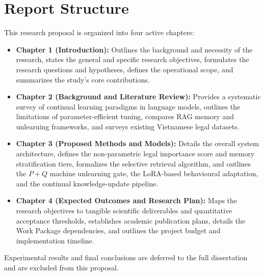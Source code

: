 \section{Report Structure}

This research proposal is organized into four active chapters:
\begin{itemize}
    \item \textbf{Chapter 1 (Introduction):} Outlines the background and necessity of the research, states the general and specific research objectives, formulates the research questions and hypotheses, defines the operational scope, and summarizes the study's core contributions.
    \item \textbf{Chapter 2 (Background and Literature Review):} Provides a systematic survey of continual learning paradigms in language models, outlines the limitations of parameter-efficient tuning, compares RAG memory and unlearning frameworks, and surveys existing Vietnamese legal datasets.
    \item \textbf{Chapter 3 (Proposed Methods and Models):} Details the overall system architecture, defines the non-parametric legal importance score and memory stratification tiers, formalizes the selective retrieval algorithm, and outlines the $P+Q$ machine unlearning gate, the LoRA-based behavioural adaptation, and the continual knowledge-update pipeline.
    \item \textbf{Chapter 4 (Expected Outcomes and Research Plan):} Maps the research objectives to tangible scientific deliverables and quantitative acceptance thresholds, establishes academic publication plans, details the Work Package dependencies, and outlines the project budget and implementation timeline.
\end{itemize}

Experimental results and final conclusions are deferred to the full dissertation and are excluded from this proposal.
